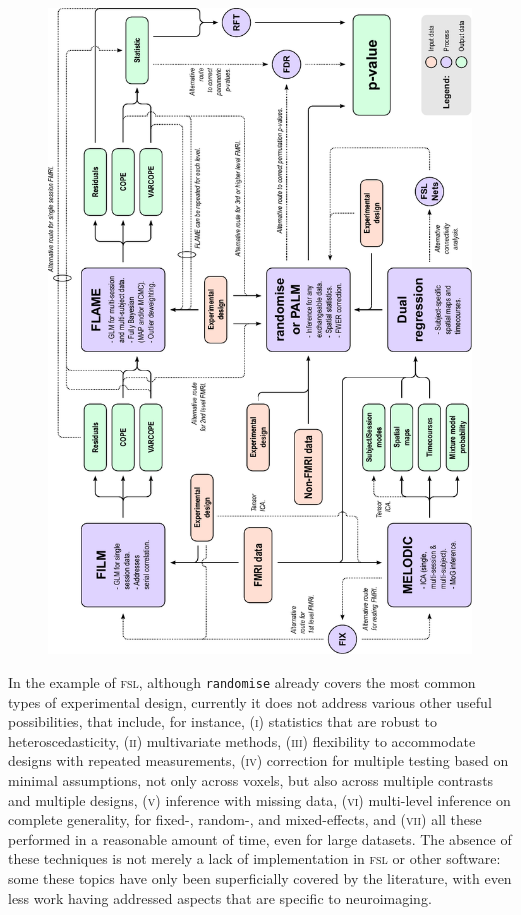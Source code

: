 \begin{figure}[!p]
\begin{center}
\includegraphics[width=\textwidth]{figures/fsl.pdf}
\end{center}
\label{fig:fsl_noref}
\end{figure}

In the example of \textsc{fsl}, although \texttt{randomise} already covers the most common types of experimental design, currently it does not address various other useful possibilities, that include, for instance, (\textsc{i}) statistics that are robust to heteroscedasticity, (\textsc{ii}) multivariate methods, (\textsc{iii}) flexibility to accommodate designs with repeated measurements, (\textsc{iv}) correction for multiple testing based on minimal assumptions, not only across voxels, but also across multiple contrasts and multiple designs, (\textsc{v}) inference with missing data, (\textsc{vi}) multi-level inference on complete generality, for fixed-, random-, and mixed-effects, and (\textsc{vii}) all these performed in a reasonable amount of time, even for large datasets. The absence of these techniques is not merely a lack of implementation in \textsc{fsl} or other software: some these topics have only been superficially covered by the literature, with even less work having addressed aspects that are specific to neuroimaging.

